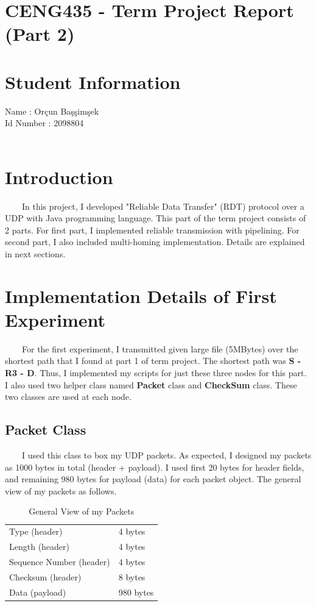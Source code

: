 \documentclass[12pt]{article}
\begin{document}
\section*{CENG435 - Term Project Report (Part 2) } 

\section*{Student Information }

Name : Orçun Başşimşek \\
Id Number : 2098804 \\
\\

\section{Introduction}

\ \ \ \ In this project, I developed "Reliable Data Transfer" (RDT) protocol over a UDP with Java programming language. This part of the term project consists of 2 parts. For first part, I implemented reliable transmission with pipelining. For second part, I also included multi-homing implementation. Details are explained in next sections.

\section{Implementation Details of First Experiment}

\ \ \ \ For the first experiment, I transmitted given large file (5MBytes) over the shortest path that I found at part 1 of term project. The shortest path was \textbf{S - R3 - D}. Thus, I implemented my scripts for just these three nodes for this part. I also used two helper class named \textbf{Packet} class and \textbf{CheckSum} class. These two classes are used at each node.

\subsection{Packet Class}
\ \ \ \ I used this class to box my UDP packets. As expected, I designed my packets as 1000 bytes in total (header + payload). I used first 20 bytes for header fields, and remaining 980 bytes for payload (data) for each packet object. The general view of my packets as follows.



\begin{table}[H]
  \centering
    \begin{tabular}{|l l|}
    \hline
    Type (header)   & 4 bytes     \\
    Length (header)   & 4 bytes     \\
    Sequence Number (header)   & 4 bytes     \\
    Checksum (header)   & 8 bytes     \\
    Data (payload)   & 980 bytes     \\
    \hline
    \end{tabular}%
    \caption{General View of my Packets}
\end{table}%
\end{document}
